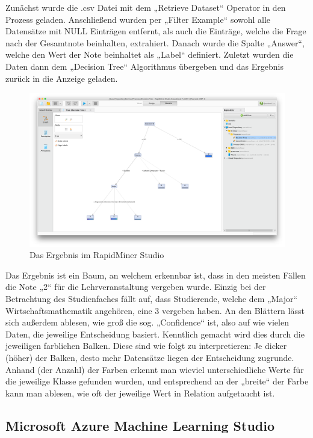 Zunächst wurde die .csv Datei mit dem „Retrieve Dataset“ Operator in den Prozess
geladen. Anschließend wurden per „Filter Example“ sowohl alle Datensätze mit
NULL Einträgen entfernt, als auch die Einträge, welche die Frage nach der
Gesamtnote beinhalten, extrahiert. Danach wurde die Spalte „Answer“, welche den
Wert der Note beinhaltet als „Label“ definiert. Zuletzt wurden die Daten dann
dem „Decision Tree“ Algorithmus übergeben und das Ergebnis zurück in die Anzeige
geladen.

\begin{figure}[htb]
	\includegraphics[width=\textwidth]{gfx/rmres.png}
	\caption{Das Ergebnis im RapidMiner Studio}
	\label{fig:example:impl:rm:res}
\end{figure}

Das Ergebnis ist ein Baum, an welchem erkennbar ist, dass in den meisten Fällen
die Note „2“ für die Lehrveranstaltung vergeben wurde. Einzig bei der
Betrachtung des Studienfaches fällt auf, dass Studierende, welche dem „Major“
Wirtschaftsmathematik angehören, eine 3 vergeben haben. An den Blättern lässt
sich außerdem ablesen, wie groß die sog. „Confidence“ ist, also auf wie vielen
Daten, die jeweilige Entscheidung basiert. Kenntlich gemacht wird dies durch
die jeweiligen farblichen Balken. Diese sind wie folgt zu interpretieren: Je
dicker (höher) der Balken, desto mehr Datensätze liegen der Entscheidung
zugrunde. Anhand (der Anzahl) der Farben erkennt man wieviel unterschiedliche
Werte für die jeweilige Klasse gefunden wurden, und entsprechend an der „breite“
der Farbe kann man ablesen, wie oft der jeweilige Wert in Relation aufgetaucht
ist.

\subsection{Microsoft Azure Machine Learning Studio}
\label{sec:example:impl:msa}

